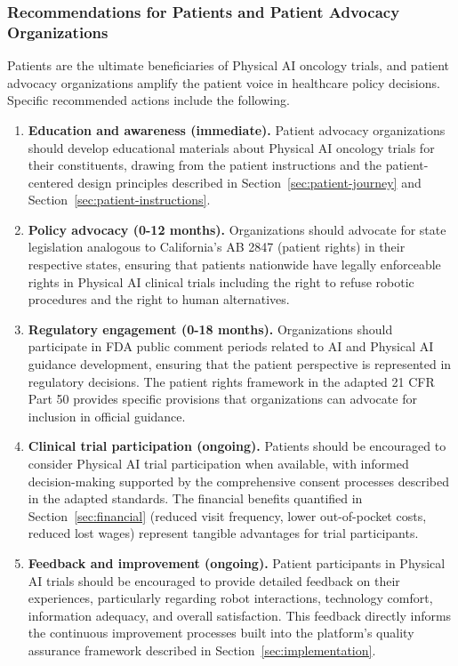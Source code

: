 \subsubsection{Recommendations for Patients and Patient Advocacy Organizations}

Patients are the ultimate beneficiaries of Physical AI oncology trials, and
patient advocacy organizations amplify the patient voice in healthcare policy
decisions. Specific recommended actions include the following.

\begin{enumerate}[nosep]
  \item \textbf{Education and awareness (immediate).} Patient advocacy
    organizations should develop educational materials about Physical AI
    oncology trials for their constituents, drawing from the patient
    instructions \cite{patient-instructions-paper} and the patient-centered
    design principles described in Section~\ref{sec:patient-journey} and
    Section~\ref{sec:patient-instructions}.

  \item \textbf{Policy advocacy (0-12 months).} Organizations should advocate
    for state legislation analogous to California's AB 2847 (patient rights)
    in their respective states, ensuring that patients nationwide have legally
    enforceable rights in Physical AI clinical trials including the right to
    refuse robotic procedures and the right to human alternatives.

  \item \textbf{Regulatory engagement (0-18 months).} Organizations should
    participate in FDA public comment periods related to AI and Physical AI
    guidance development, ensuring that the patient perspective is represented
    in regulatory decisions. The patient rights framework in the adapted 21
    CFR Part 50 \cite{cfr50-adapt} provides specific provisions that
    organizations can advocate for inclusion in official guidance.

  \item \textbf{Clinical trial participation (ongoing).} Patients should be
    encouraged to consider Physical AI trial participation when available,
    with informed decision-making supported by the comprehensive consent
    processes described in the adapted standards. The financial benefits
    quantified in Section~\ref{sec:financial} (reduced visit frequency, lower
    out-of-pocket costs, reduced lost wages) represent tangible advantages
    for trial participants.

  \item \textbf{Feedback and improvement (ongoing).} Patient participants in
    Physical AI trials should be encouraged to provide detailed feedback on
    their experiences, particularly regarding robot interactions, technology
    comfort, information adequacy, and overall satisfaction. This feedback
    directly informs the continuous improvement processes built into the
    platform's quality assurance framework described in
    Section~\ref{sec:implementation}.
\end{enumerate}

